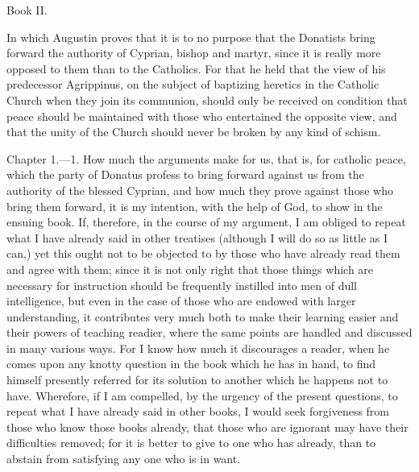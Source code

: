 Book II.

In which Augustin proves that it is to no purpose that the Donatists bring forward the authority of Cyprian, bishop and martyr, since it is really more opposed to them than to the Catholics. For that he held that the view of his predecessor Agrippinus, on the subject of baptizing heretics in the Catholic Church when they join its communion, should only be received on condition that peace should be maintained with those who entertained the opposite view, and that the unity of the Church should never be broken by any kind of schism.


Chapter 1.—1. How much the arguments make for us, that is, for catholic peace, which the party of Donatus profess to bring forward against us from the authority of the blessed Cyprian, and how much they prove against those who bring them forward, it is my intention, with the help of God, to show in the ensuing book. If, therefore, in the course of my argument, I am obliged to repeat what I have already said in other treatises (although I will do so as little as I can,) yet this ought not to be objected to by those who have already read them and agree with them; since it is not only right that those things which are necessary for instruction should be frequently instilled into men of dull intelligence, but even in the case of those who are endowed with larger understanding, it contributes very much both to make their learning easier and their powers of teaching readier, where the same points are handled and discussed in many various ways. For I know how much it discourages a reader, when he comes upon any knotty question in the book which he has in hand, to find himself presently referred for its solution to another which he happens not to have. Wherefore, if I am compelled, by the urgency of the present questions, to repeat what I have already said in other books, I would seek forgiveness from those who know those books already, that those who are ignorant may have their difficulties removed; for it is better to give to one who has already, than to abstain from satisfying any one who is in want.

